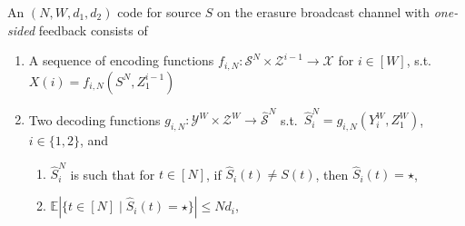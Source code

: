\begin{mydef}
\label{def:code_one_sided}
	An $(N, W, d_{1}, d_{2})$ code for source $S$ on the erasure broadcast channel with \emph{one-sided} feedback consists of	
	\begin{enumerate}
		\item A sequence of encoding functions $f_{i, N} : \mathcal{S}^{N} \times  \mathcal{Z}^{i-1} \to \mathcal{X}$ for $i \in [W]$, s.t.\ $X(i) = f_{i, N}(S^{N}, Z_1^{i -1})$
		
		\item Two decoding functions $g_{i,N} : \mathcal{Y}^{W} \times \mathcal{Z}^{W} \to \mathcal{\hat{S}}^{N}$ s.t.\ $\hat{S}_{i}^{N} = g_{i,N}(Y_{i}^{W}, Z_1^{W})$, $i \in \{1, 2\}$, and
		\begin{enumerate}
			\item $\hat{S}_{i}^{N}$ is such that for $t \in [N]$, if $\hat{S}_{i}(t) \neq S(t)$, then $\hat{S}_{i}(t) = \star$,
			\item $\mathbb{E}   \left\vert{\{t \in [N] \mid \hat{S}_{i}(t) = \star\}}\right\vert \leq N d_{i}$,
		\end{enumerate}
		 	
	\end{enumerate}
	
\end{mydef}

